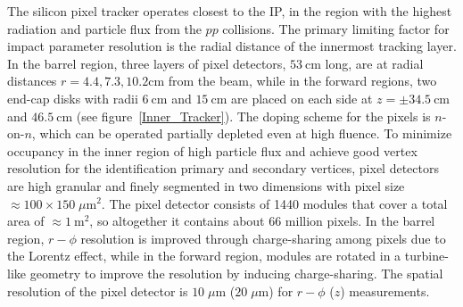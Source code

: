 The silicon pixel tracker operates closest to the IP, in the region with the highest radiation and particle flux from the $pp$ collisions.
The primary limiting factor for impact parameter resolution is the radial distance of the innermost tracking layer.
In the barrel region, three layers of pixel detectors, $\SI{53}{\cm}$ long, are at radial distances $r = 4.4, 7.3, 10.2 \si{\cm}$ from the beam, while in the forward regions, two end-cap disks with radii $\SI{6}{\cm}$ and $\SI{15}{\cm}$ are placed on each side at $z = \pm \SI{34.5}{\cm}$ and $\SI{46.5}{\cm}$ (see figure~\ref{Inner_Tracker}).
The doping scheme for the pixels is $n$-on-$n$, which can be operated partially depleted even at high fluence.
To minimize occupancy in the inner region of high particle flux and achieve good vertex resolution for the identification primary and secondary vertices, pixel detectors are high granular and finely segmented in two dimensions with pixel size $\approx 100 \times 150 \; \mu \si{\m \squared}$.
The pixel detector consists of 1440 modules that cover a total area of $\approx \SI{1}{\m \squared}$, so altogether it contains about 66 million pixels.
In the barrel region, $r-\phi$ resolution is improved through charge-sharing among pixels due to the Lorentz effect, while in the forward region, modules are rotated in a turbine-like geometry to improve the resolution by inducing charge-sharing.
The spatial resolution of the pixel detector is $10 \; \mu \si{\m}$ ($20 \; \mu \si{\m}$) for $r-\phi$ ($z$) measurements.

